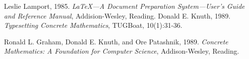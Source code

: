 \documentclass[journal]{IEEEtran}
\begin{document}

%
%
%


\begin{thebibliography}{9}
 Leslie Lamport, 1985. \emph{\LaTeX---A Document
Preparation System---User’s Guide and Reference Manual},
Addision-Wesley, Reading.
 Donald E. Knuth, 1989. \emph{Typesetting Concrete
Mathematics}, TUGBoat, 10(1):31-36.

 Ronald L. Graham, Donald E. Knuth, and Ore
Patashnik, 1989. \emph{Concrete Mathematics: A Foundation for
Computer Science}, Addison-Wesley, Reading.
\end{thebibliography}
% 







\end{document}
